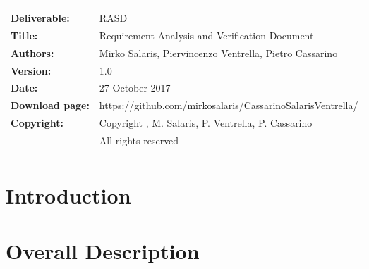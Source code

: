 
 




\begin{table}[h!]
\begin{tabu} to \textwidth { X[0.3,r,p] X[0.7,l,p] }
\hline
\smallskip & \smallskip\\
\textbf{Deliverable:} & RASD\\
\textbf{Title:} & Requirement Analysis and Verification Document \\
\textbf{Authors:} & Mirko Salaris, Piervincenzo Ventrella, Pietro Cassarino \\
\textbf{Version:} & 1.0 \\ 
\textbf{Date:} & 27-October-2017 \\
\textbf{Download page:} & https://github.com/mirkosalaris/CassarinoSalarisVentrella/\\
\textbf{Copyright:} & Copyright , M. Salaris, P. Ventrella, P. Cassarino\\
\hfill & All rights reserved \\
\smallskip & \smallskip\\
\hline
\end{tabu}
\end{table}

\newpage
\renewcommand{\contentsname}{Table of Contents} %
{\hypersetup{hidelinks}
\tableofcontents
\listoffigures
}

\clearpage
\section{Introduction}
\label{sect:introduction}


\clearpage
\section{Overall Description}
\label{sect:overview}


